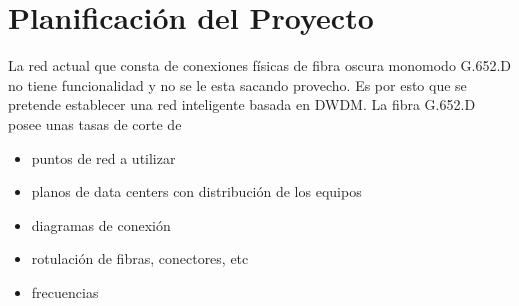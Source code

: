 \section{Planificaci\'on del Proyecto}\label{sec:planificacion}

La red actual que consta de conexiones físicas de fibra oscura monomodo G.652.D no tiene funcionalidad y no se le esta sacando provecho. Es por esto que se pretende establecer una red inteligente basada en DWDM. La fibra G.652.D posee unas tasas de corte de 




\begin{itemize}
\item puntos de red a utilizar
\item planos de data centers con distribución de los equipos
\item diagramas de conexión
\item rotulación de fibras, conectores, etc
\item frecuencias
\end{itemize}
